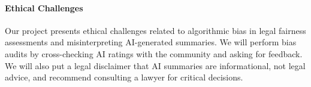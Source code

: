 \documentclass{article}
\begin{document}
\paragraph{Ethical Challenges}
Our project presents ethical challenges related to algorithmic bias in legal fairness assessments and misinterpreting AI-generated summaries. We will perform bias audits by cross-checking AI ratings with the community and asking for feedback. We will also put a legal disclaimer that AI summaries are informational, not legal advice, and recommend consulting a lawyer for critical decisions.



\end{document}
